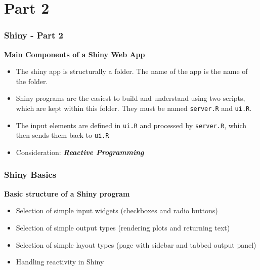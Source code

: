 \documentclass{beamer}
\begin{document}
\section{Part 2}
\begin{frame}
	\frametitle{Shiny - Part 2}
	\Large
	\textbf{Main Components of a Shiny Web App} 
	\begin{itemize}
		\item The shiny app is structurally a folder. The name of the app is the name of the folder.
		\item  Shiny programs are the easiest to build and
		understand using two scripts, which are kept within this folder. They must be
		named \texttt{server.R} and \texttt{ui.R}.
		\item 
		The input elements are defined in
		\texttt{ui.R} and processed by \texttt{server.R}, which then sends them back to \texttt{ui.R}
		\item Consideration: \textbf{\textit{Reactive Programming}}
	\end{itemize}
	
	
\end{frame}

\begin{frame}
	\frametitle{Shiny Basics}
	\Large
	\vspace{-0.5cm}
	\textbf{Basic structure of a Shiny program}
	\begin{itemize}
		\item  Selection of simple input widgets (checkboxes and radio buttons)
		\item  Selection of simple output types (rendering plots and returning text)
		\item  Selection of simple layout types (page with sidebar and tabbed output panel)
		\item  Handling reactivity in Shiny
	\end{itemize}
\end{frame}
\end{document}

